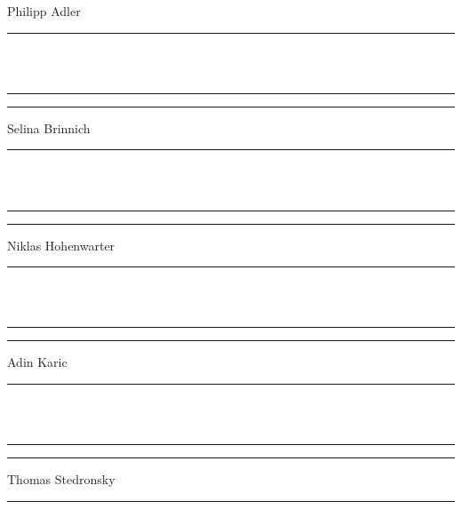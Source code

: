 \documentclass[a4paper,12pt,twoside,openany]{book}
\begin{document}
\hfill \hfill Philipp Adler \rule[-0.2cm]{5.5cm}{0pt}\\ \\

\hfill \hfill \rule[-0.2cm]{6cm}{0.5pt} \rule[-0.2cm]{2cm}{0pt}

\hfill \hfill Selina Brinnich \rule[-0.2cm]{5.2cm}{0pt}\\ \\

\hfill \hfill \rule[-0.2cm]{6cm}{0.5pt} \rule[-0.2cm]{2cm}{0pt}

\hfill \hfill Niklas Hohenwarter \rule[-0.2cm]{4.4cm}{0pt}\\ \\

\hfill \hfill \rule[-0.2cm]{6cm}{0.5pt} \rule[-0.2cm]{2cm}{0pt}

\hfill \hfill Adin Karic \rule[-0.2cm]{6.0cm}{0pt}\\ \\

\hfill \hfill \rule[-0.2cm]{6cm}{0.5pt} \rule[-0.2cm]{2cm}{0pt}

\hfill \hfill Thomas Stedronsky \rule[-0.2cm]{4.4cm}{0pt}

\newpage
\thispagestyle{empty}
\null\newpage

\thispagestyle{empty}
\vspace*{\fill} 

\label{danksagung}
\vspace*{\fill} 

\newpage

\thispagestyle{empty}
\null\newpage

\thispagestyle{empty}
\vspace*{\fill} 

\label{zitat}
\vspace*{\fill} 

\newpage
\thispagestyle{empty}
\null\newpage

\thispagestyle{empty}
\vspace*{\fill} 

\label{gender}
\vspace*{\fill}

\newpage
\thispagestyle{empty}
\null\newpage

\thispagestyle{empty}




\newpage
\end{document}
